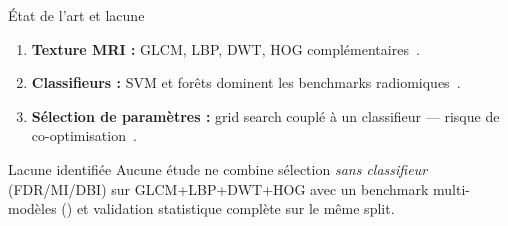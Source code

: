 \begin{frame}{État de l'art et lacune}
  \begin{enumerate}
    \item \textbf{Texture MRI :} GLCM, LBP, DWT, HOG complémentaires~\cite{ref_fonc20231248452,ref_fnins2021634926}.
    \item \textbf{Classifieurs :} SVM et forêts dominent les benchmarks radiomiques~\cite{ref_s41598024772437,ref_iasc2023032426}.
    \item \textbf{Sélection de paramètres :} grid search couplé à un classifieur --- risque de co-optimisation~\cite{ref_s44163024002144,ref_ijigsp20150303}.
  \end{enumerate}
  \vspace{0.5em}
  \begin{alertblock}{Lacune identifiée}
    Aucune étude ne combine sélection \emph{sans classifieur} (FDR/MI/DBI) sur GLCM+LBP+DWT+HOG
    avec un benchmark multi-modèles (\NModels) et validation statistique complète sur le même split.
  \end{alertblock}
\end{frame}

